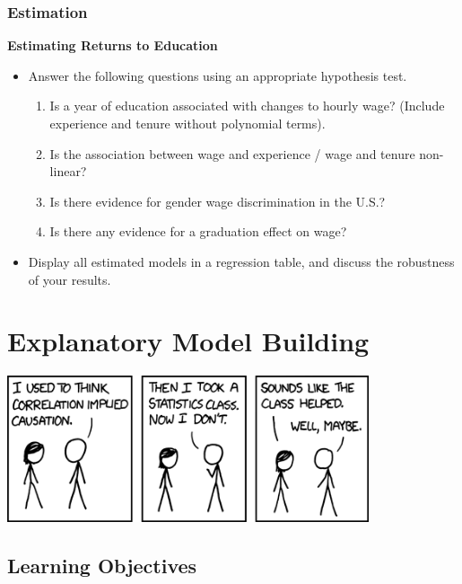 \documentclass[
]{book}
\providecommand{\tightlist}{%
  \setlength{\itemsep}{0pt}\setlength{\parskip}{0pt}}
\theoremstyle{definition}
\theoremstyle{definition}
\theoremstyle{definition}
\theoremstyle{definition}
\theoremstyle{remark}
\begin{document}
\hypertarget{estimation}{%
\subsection{Estimation}\label{estimation}}

\textbf{Estimating Returns to Education}

\begin{itemize}
\tightlist
\item
  Answer the following questions using an appropriate hypothesis test.

  \begin{enumerate}
  \def\labelenumi{\arabic{enumi}.}
  \tightlist
  \item
    Is a year of education associated with changes to hourly wage? (Include experience and tenure without polynomial terms).
  \item
    Is the association between wage and experience / wage and tenure non-linear?
  \item
    Is there evidence for gender wage discrimination in the U.S.?
  \item
    Is there any evidence for a graduation effect on wage?
  \end{enumerate}
\item
  Display all estimated models in a regression table, and discuss the robustness of your results.
\end{itemize}

\hypertarget{explanatory-model-building}{%
\chapter{Explanatory Model Building}\label{explanatory-model-building}}

\includegraphics[width=0.8\textwidth,height=\textheight]{./images/correlation.png}

\hypertarget{learning-objectives-10}{%
\section{Learning Objectives}\label{learning-objectives-10}}
\end{document}
